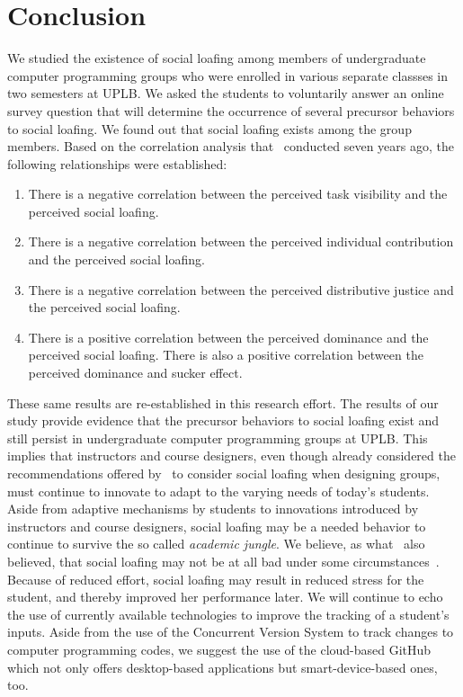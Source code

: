 \documentclass[a4paper,a4paper,BCOR12mm,12pt,abstracton,pointednumbers,tablecaptionabove,footinclude,halfparskip,normalheadings,]{scrartcl}
\begin{document}
\section{Conclusion}\label{sec:conclude}

We studied the existence of social loafing among members of undergraduate computer programming groups who were enrolled in various separate classses in two semesters at UPLB. We asked the students to voluntarily answer an online survey question that will determine the occurrence of several precursor behaviors to social loafing. We found out that social loafing exists among the group members. Based on the correlation analysis that~\citet{Pabico08} conducted seven years ago, the following relationships were established: 
\begin{enumerate}
\item There is a negative correlation between the perceived task visibility and the perceived social loafing. 
\item There is a negative correlation between the perceived individual contribution and the perceived social loafing. 
\item There is a negative correlation between the perceived distributive justice and the perceived social loafing. 
\item There is a positive correlation between the perceived dominance and the perceived social loafing. There is also a positive correlation between the perceived dominance and sucker effect. 
\end{enumerate}

These same results are re-established in this research effort. The results of our study provide evidence that the precursor behaviors to social loafing exist and  still persist in undergraduate computer programming groups at UPLB. This implies that instructors and course designers, even though already considered the recommendations offered by~\citet{Pabico08} to consider social loafing when designing groups, must continue to innovate to adapt to the varying needs of today's students. Aside from adaptive mechanisms by students to innovations introduced by instructors and course designers, social loafing may be a needed behavior to continue to survive the so called {\em academic jungle}. We believe, as what~\citet{Pabico08} also believed, that social loafing may not be at all bad under some circumstances~\citep{Jackson85}. Because of reduced effort, social loafing may result in reduced stress for the student, and thereby improved her performance later. We will continue to echo the use of currently available technologies to improve the tracking of a student's inputs. Aside from the use of the Concurrent Version System to track changes to computer programming codes, we suggest the use of the cloud-based GitHub which not only offers desktop-based applications but smart-device-based ones, too.
\end{document}
